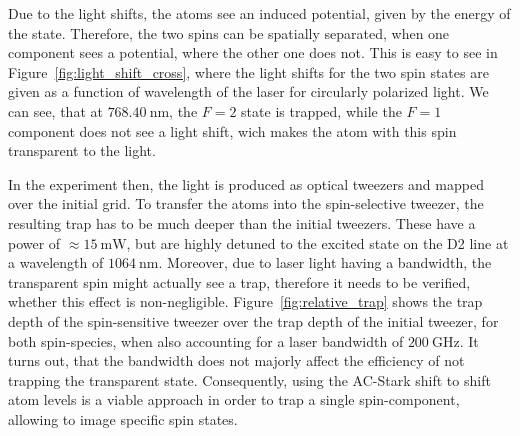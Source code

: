 Due to the light shifts, the atoms see an induced potential, given by the energy of the state. Therefore, the two spins can be spatially separated, when one component sees a potential, where the other one does not. This is easy to see in Figure~\ref{fig:light_shift_cross}, where the light shifts for the two spin states are given as a function of wavelength of the laser for circularly polarized light. We can see, that at $\SI{768.40}{\nano\meter}$, the $F=2$ state is trapped, while the $F=1$ component does not see a light shift, wich makes the atom with this spin transparent to the light.

\begin{figure}[t]%
%
\end{figure}%

In the experiment then, the light is produced as optical tweezers and mapped over the initial grid. To transfer the atoms into the spin-selective tweezer, the resulting trap has to be much deeper than the initial tweezers. These have a power of $\approx\SI{15}{\milli\watt}$, but are highly detuned to the excited state on the D2 line at a wavelength of $\SI{1064}{\nano\meter}$. Moreover, due to laser light having a bandwidth, the transparent spin might actually see a trap, therefore it needs to be verified, whether this effect is non-negligible. Figure~\ref{fig:relative_trap} shows the trap depth of the spin-sensitive tweezer over the trap depth of the initial tweezer, for both spin-species, when also accounting for a laser bandwidth of $\SI{200}{\giga\hertz}$. It turns out, that the bandwidth does not majorly affect the efficiency of not trapping the transparent state. Consequently, using the AC-Stark shift to shift atom levels is a viable approach in order to trap a single spin-component, allowing to image specific spin states.


